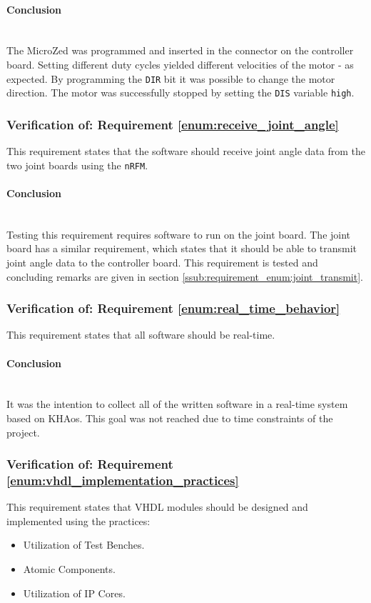 \paragraph{Conclusion}~\\
The MicroZed was programmed and inserted in the connector on the controller board.
Setting different duty cycles yielded different velocities of the motor - as expected.
By programming the \texttt{DIR} bit it was possible to change the motor direction.
The motor was successfully stopped by setting the \texttt{DIS} variable \texttt{high}.

\subsubsection{Verification of: Requirement \ref{enum:receive_joint_angle}} %
\label{ssub:verificatation_of_requirement_enum:receive_joint_angle}
This requirement states that the software should receive joint angle data from the two joint boards using the \texttt{nRFM}.

\paragraph{Conclusion}~\\
Testing this requirement requires software to run on the joint board.
The joint board has a similar requirement, which states that it should be able to transmit joint angle data to the controller board.
This requirement is tested and concluding remarks are given in section \ref{ssub:requirement_enum:joint_transmit}.

\subsubsection{Verification of: Requirement \ref{enum:real_time_behavior}} %
\label{ssub:verification_of_requirement_of_requirement_enum:real_time_behavior}
This requirement states that all software should be real-time.
\paragraph{Conclusion}~\\
It was the intention to collect all of the written software in a real-time system based on KHAos.
This goal was not reached due to time constraints of the project. 

\subsubsection{Verification of: Requirement \ref{enum:vhdl_implementation_practices}} %
\label{ssub:verification_of_requirement_enum:vhdl_implementation_practices}
This requirement states that VHDL modules should be designed and implemented using the practices:
\begin{itemize}
	\item Utilization of Test Benches.
	\item Atomic Components.
	\item Utilization of IP Cores.
\end{itemize}

